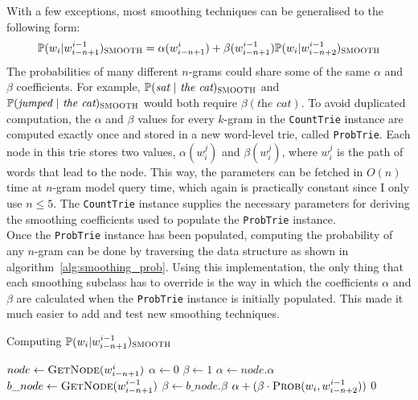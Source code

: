 \documentclass[a4paper, 12pt]{report}
\newcommand{\ttt}[1]{\texttt{#1}}
\newcommand{\tit}[1]{\textit{#1}}
\begin{document}
With a few exceptions, most smoothing techniques can be generalised to the following form:
\begin{gather} \label{eq:smoothing_general}
	\mathbb{P}(w_i | w_{i - n + 1}^{i - 1})_{\text{\scshape SMOOTH}} = \alpha(w_{i - n + 1}^i) + \beta(w_{i - n + 1}^{i - 1})\mathbb{P}(w_i | w_{i - n + 2}^{i - 1})_{\text{\scshape SMOOTH}}
\end{gather}
The probabilities of many different $n$-grams could share some of the same $\alpha$ and $\beta$ coefficients. For example, $\mathbb{P}(\tit{sat}\ |\ \tit{the cat})_{\text{\scshape SMOOTH}}$ and $\mathbb{P}(\tit{jumped}\ |\ \tit{the cat})_{\text{\scshape SMOOTH}}$ would both require $\beta(\tit{the cat})$. To avoid duplicated computation, the $\alpha$ and $\beta$ values for every $k$-gram in the \ttt{CountTrie} instance are computed exactly once and stored in a new word-level trie, called \ttt{ProbTrie}. Each node in this trie stores two values, $\alpha(w_i^j)$ and $\beta(w_i^j)$, where $w_i^j$ is the path of words that lead to the node. This way, the parameters can be fetched in $O(n)$ time at $n$-gram model query time, which again is practically constant since I only use $n \leq 5$. The \ttt{CountTrie} instance supplies the necessary parameters for deriving the smoothing coefficients used to populate the \ttt{ProbTrie} instance. \\

Once the \ttt{ProbTrie} instance has been populated, computing the probability of any $n$-gram can be done by traversing the data structure as shown in algorithm~\ref{alg:smoothing_prob}. Using this implementation, the only thing that each smoothing subclass has to override is the way in which the coefficients $\alpha$ and $\beta$ are calculated when the \ttt{ProbTrie} instance is initially populated. This made it much easier to add and test new smoothing techniques.

\begin{algorithm}
\caption{Computing $\mathbb{P}(w_i | w_{i - n + 1}^{i - 1})_{\text{\scshape SMOOTH}}$}
\label{alg:smoothing_prob}
\begin{algorithmic}[1]
	\State $node \gets \text{\scshape GetNode}(w_{i - n + 1}^i)$
	\State $\alpha \gets 0$
	\State $\beta \gets 1$
		\State $\alpha \gets node.\alpha$
	\EndIf
		\State $b\_node \gets \text{\scshape GetNode}(w_{i - n + 1}^{i - 1})$
			\State $\beta \gets b\_node.\beta$
		\EndIf
	\EndIf
	\State \Return $\alpha + (\beta \cdot \text{\scshape Prob}(w_i, w_{i - n + 2}^{i - 1}))$
\EndIf
\State \Return $0$
\EndProcedure
\end{algorithmic}
\end{algorithm}
\end{document}

